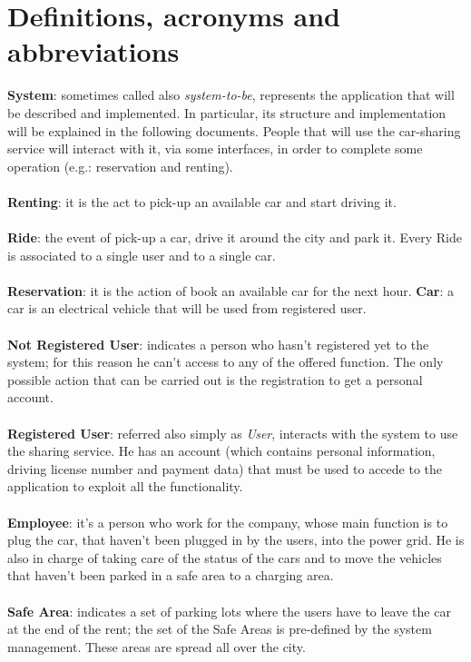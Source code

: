\documentclass[11pt,a4paper]{report}
\begin{document}
\section{Definitions, acronyms and abbreviations}
\textbf{System}: sometimes called also \textit{system-to-be}, represents the application that will be described and implemented.
In particular, its structure and implementation will be explained in the following documents. People that will use the car-sharing service will interact with it, via some interfaces, in order to complete some operation (e.g.: reservation and renting).\\
\noindent \\
\textbf{Renting}: it is the act to pick-up an available car and start driving it.\\
\noindent \\
\textbf{Ride}: the event of pick-up a car, drive it around the city and park it. Every Ride is associated to a single user and to a single car.\\
\noindent \\
\textbf{Reservation}: it is the action of book an available car for the next hour. 
\textbf{Car}: a car is an electrical vehicle that will be used from registered user. \\
\noindent \\
\textbf{Not Registered User}: indicates a person who hasn't registered yet to the system; for this reason he can't access to any of the offered function. The only possible action that can be carried out is the registration to get a personal account.\\ 
\indent \\
\textbf{Registered User}: referred also simply as \textit{User}, interacts with the system to use the sharing service. He has an account (which contains personal information, driving license number and payment data) that must be used to accede to the application to exploit all the functionality. \\
\noindent \\
\textbf{Employee}: it's a person who work for the company, whose main function is to plug the car, that haven't been plugged in by the users, into the power grid. He is also in charge of taking care of the status of the cars and to move the vehicles that haven't been parked in a safe area to a charging area.\\
\noindent \\
\textbf{Safe Area}: indicates a set of parking lots where the users have to leave the car at the end of the rent; the set of the Safe Areas is pre-defined by the system management. These areas are spread all over the city.\\
\end{document}
